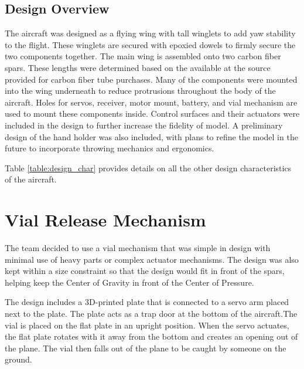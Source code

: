     
    \subsection{Design Overview}
    
        The aircraft was designed as a flying wing with tall winglets to add yaw stability to the flight. These winglets are secured with epoxied dowels to firmly secure the two components together. The main wing is assembled onto two carbon fiber spars. These lengths were determined based on the available at the source provided for carbon fiber tube purchases. Many of the components were mounted into the wing underneath to reduce protrusions throughout the body of the aircraft. Holes for servos, receiver, motor mount, battery, and vial mechanism are used to mount these components inside. Control surfaces and their actuators were included in the design to further increase the fidelity of model. A preliminary design of the hand holder was also included, with plans to refine the model in the future to incorporate throwing mechanics and ergonomics.
        
        Table \ref{table:design_char} provides details on all the other design characteristics of the aircraft.
        

\section{Vial Release Mechanism}

    The team decided to use a vial mechanism that was simple in design with minimal use of heavy parts or complex actuator mechanisms. The design was also kept within a size constraint so that the design would fit in front of the spars, helping keep the Center of Gravity in front of the Center of Pressure. 
    
    The design includes a 3D-printed plate that is connected to a servo arm placed next to the plate. The plate acts as a trap door at the bottom of the aircraft.The vial is placed on the flat plate in an upright position. When the servo actuates, the flat plate rotates with it away from the bottom and creates an opening out of the plane. The vial then falls out of the plane to be caught by someone on the ground.
    
